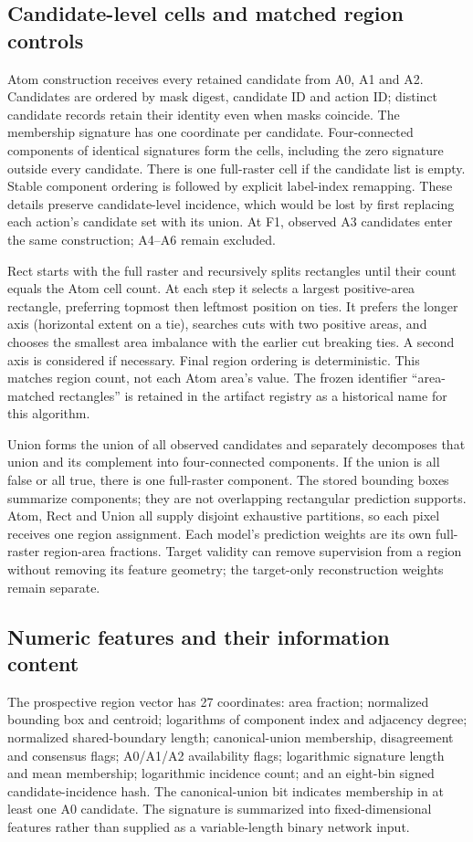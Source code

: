 \subsection{Candidate-level cells and matched region controls}
Atom construction receives every retained candidate from A0, A1 and A2.
Candidates are ordered by mask digest, candidate ID and action ID; distinct
candidate records retain their identity even when masks coincide. The
membership signature has one coordinate per candidate. Four-connected
components of identical signatures form the cells, including the zero
signature outside every candidate. There is one full-raster cell if the
candidate list is empty. Stable component ordering is followed by explicit
label-index remapping. These details preserve candidate-level incidence,
which would be lost by first replacing each action's candidate set with its
union. At F1, observed A3 candidates enter the same construction; A4--A6
remain excluded.

Rect starts with the full raster and recursively splits rectangles until
their count equals the Atom cell count. At each step it selects a largest
positive-area rectangle, preferring topmost then leftmost position on ties.
It prefers the longer axis (horizontal extent on a tie), searches cuts with
two positive areas, and chooses the smallest area imbalance with the earlier
cut breaking ties. A second axis is considered if necessary. Final region
ordering is deterministic. This matches region count, not each Atom area's
value. The frozen identifier ``area-matched rectangles'' is retained in the
artifact registry as a historical name for this algorithm.

Union forms the union of all observed candidates and separately decomposes
that union and its complement into four-connected components. If the union
is all false or all true, there is one full-raster component. The stored
bounding boxes summarize components; they are not overlapping rectangular
prediction supports. Atom, Rect and Union all supply disjoint exhaustive
partitions, so each pixel receives one region assignment. Each model's
prediction weights are its own full-raster region-area fractions. Target
validity can remove supervision from a region without removing its feature
geometry; the target-only reconstruction weights remain separate.

\subsection{Numeric features and their information content}
The prospective region vector has 27 coordinates: area fraction; normalized
bounding box and centroid; logarithms of component index and adjacency
degree; normalized shared-boundary length; canonical-union membership,
disagreement and consensus flags; A0/A1/A2 availability flags; logarithmic
signature length and mean membership; logarithmic incidence count; and an
eight-bin signed candidate-incidence hash. The canonical-union bit indicates
membership in at least one A0 candidate. The signature is summarized into
fixed-dimensional features rather than supplied as a variable-length binary
network input.

